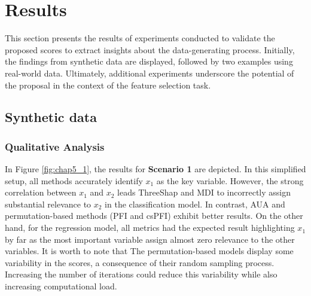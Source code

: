 \section{Results}

This section presents the results of experiments conducted to validate the proposed scores to extract insights about the data-generating process. Initially, the findings from synthetic data are displayed, followed by two examples using real-world data. Ultimately, additional experiments underscore the potential of the proposal in the context of the feature selection task.

\subsection{Synthetic data}

\subsubsection{Qualitative Analysis}

In Figure \ref{fig:chap5_1}, the results for \textbf{Scenario 1} are depicted. In this simplified setup, all methods accurately identify \(x_1\) as the key variable. However, the strong correlation between \(x_1\) and \(x_2\) leads ThreeShap and \gls{MDI} to incorrectly assign substantial relevance to \(x_2\) in the classification model. In contrast, \gls{AUA} and permutation-based methods (\gls{PFI} and \gls{csPFI}) exhibit better results. On the other hand, for the regression model, all metrics had the expected result highlighting \(x_1\) by far as the most important variable assign almost zero relevance to the other variables. It is worth to note that The permutation-based models display some variability in the scores, a consequence of their random sampling process. Increasing the number of iterations could reduce this variability while also increasing computational load. 


